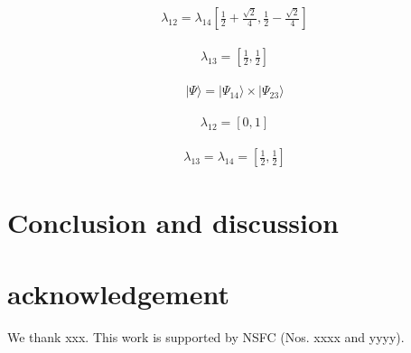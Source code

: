 \documentclass[aps,twocolumn,superscriptaddress]{revtex4-1}
\begin{document}
\begin{eqnarray}
  \lambda_{12}=\lambda_{14}\left[\frac{1}{2}+\frac{\sqrt{2}}{4},\frac{1}{2}-\frac{\sqrt{2}}{4}\right]
\end{eqnarray}

\begin{eqnarray}
  \lambda_{13}=\left[\frac{1}{2},\frac{1}{2}\right]
\end{eqnarray}

\begin{eqnarray}
  |\Psi\rangle=|\Psi_{14}\rangle \times |\Psi_{23}\rangle
\end{eqnarray}

\begin{eqnarray}
  \lambda_{12}=[0,1]
\end{eqnarray}

\begin{eqnarray}
  \lambda_{13}=\lambda_{14}=\left[\frac{1}{2},\frac{1}{2}\right]
\end{eqnarray}


\section{Conclusion and discussion}

\section{acknowledgement}
We thank xxx. This work is supported by NSFC (Nos. xxxx and yyyy).


\end{document}
